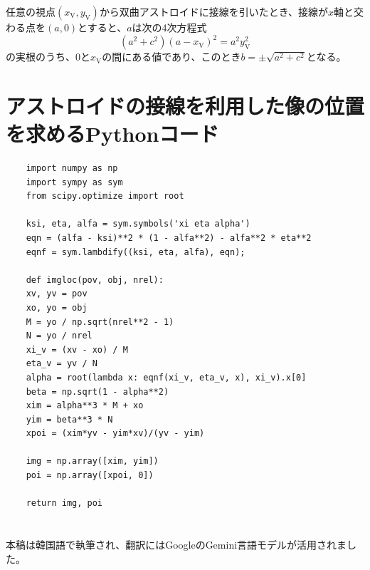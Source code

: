 \documentclass[twocolumn]{article}
\begin{document}
任意の視点$(x_{\mathrm{V}}, y_{\mathrm{V}})$から双曲アストロイドに接線を引いたとき、接線が$x$軸と交わる点を$(a,0)$とすると、$a$は次の4次方程式
$$ \left( a^2 + c^2 \right) \left(a - x_{\mathrm{V}} \right)^2 = a^2 y_{\mathrm{V}}^2$$
の実根のうち、$0$と$x_{\mathrm{V}}$の間にある値であり、このとき$b = \pm \sqrt{a^2 + c^2}$となる。

\section{アストロイドの接線を利用した像の位置を求めるPythonコード} \label{app:python}
\begin{verbatim}
	import numpy as np
	import sympy as sym
	from scipy.optimize import root
	
	ksi, eta, alfa = sym.symbols('xi eta alpha')
	eqn = (alfa - ksi)**2 * (1 - alfa**2) - alfa**2 * eta**2
	eqnf = sym.lambdify((ksi, eta, alfa), eqn);
	
	def imgloc(pov, obj, nrel):
	xv, yv = pov
	xo, yo = obj
	M = yo / np.sqrt(nrel**2 - 1)
	N = yo / nrel
	xi_v = (xv - xo) / M
	eta_v = yv / N
	alpha = root(lambda x: eqnf(xi_v, eta_v, x), xi_v).x[0]
	beta = np.sqrt(1 - alpha**2)
	xim = alpha**3 * M + xo
	yim = beta**3 * N
	xpoi = (xim*yv - yim*xv)/(yv - yim)
	
	img = np.array([xim, yim])
	poi = np.array([xpoi, 0])
	
	return img, poi
\end{verbatim}

\section*{}
\vfill
	

\noindent
本稿は韓国語で執筆され、翻訳にはGoogleのGemini言語モデルが活用されました。
%	
%	
	
\end{document}
